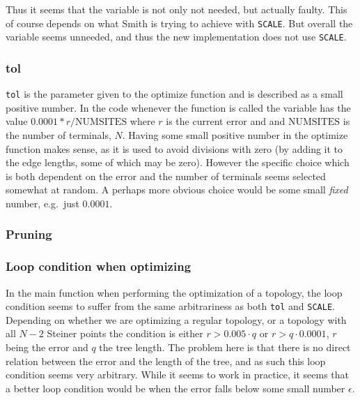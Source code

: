 Thus it seems that the variable is not only not needed, but actually faulty.
This of course depends on what Smith is trying to achieve with \texttt{SCALE}.
But overall the variable seems unneeded, and thus the new implementation does
not use \texttt{SCALE}.

\subsubsection{tol}
\label{sec:tol}

\texttt{tol} is the parameter given to the optimize function and is described as
a small positive number. In the code whenever the function is called the
variable has the value $0.0001*r/\text{NUMSITES}$ where $r$ is the current
error and and $\text{NUMSITES}$ is the number of terminals, $N$. Having some
small positive number in the optimize function makes sense, as it is used to
avoid divisions with zero (by adding it to the edge lengths, some of which may
be zero). However the specific choice which is both dependent on the error and
the number of terminals seems selected somewhat at random. A perhaps more
obvious choice would be some small \textit{fixed} number, e.g.\ just $0.0001$.


\subsubsection{Pruning}
\label{sec:pruning}


\subsubsection{Loop condition when optimizing}
\label{sec:loop-condition-when-1}

In the main function when performing the optimization of a topology, the loop
condition seems to suffer from the same arbitrariness as both \texttt{tol} and
\texttt{SCALE}. Depending on whether we are optimizing a regular topology, or a
topology with all $N-2$ Steiner points the condition is either $r > 0.005 \cdot
q$ or $r > q \cdot 0.0001$, $r$ being the error and $q$ the tree length. The
problem here is that there is no direct relation between the error and the
length of the tree, and as such this loop condition seems very arbitrary. While
it seems to work in practice, it seems that a better loop condition would be
when the error falls below some small number $\epsilon$.

